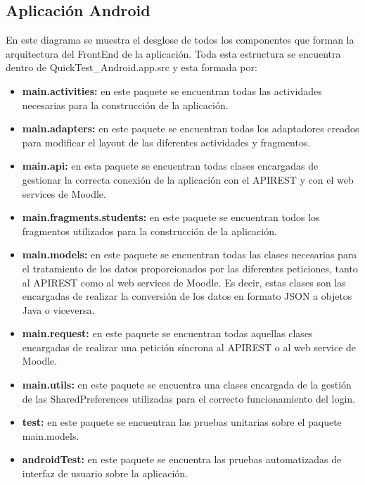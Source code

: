 
\subsection{Aplicación Android}

En este diagrama se muestra el desglose de todos los componentes que forman la arquitectura del FrontEnd de la aplicación. Toda esta estructura se encuentra dentro de QuickTest\_Android.app.src y esta formada por:

\begin{itemize}

	\item \textbf{main.activities:} en este paquete se encuentran todas las actividades necesarias para la construcción de la aplicación.
	\item \textbf{main.adapters:} en este paquete se encuentran todas los adaptadores creados para modificar el layout de las diferentes actividades y fragmentos.
	\item \textbf{main.api:} en esta paquete se encuentran todas clases encargadas de gestionar la correcta conexión de la aplicación con el APIREST y con el web services de Moodle.
	\item \textbf{main.fragments.students:} en este paquete se encuentran todos los fragmentos utilizados para la construcción de la aplicación.
	\item \textbf{main.models:} en este paquete se encuentran todas las clases necesarias para el tratamiento de los datos proporcionados por las diferentes peticiones, tanto al APIREST como al web services de Moodle. Es decir, estas clases son las encargadas de realizar la conversión de los datos en formato JSON a objetos Java o viceversa.
	\item \textbf{main.request:} en este paquete se encuentran todas aquellas clases encargadas de realizar una petición síncrona al APIREST o al web service de Moodle.
	\item \textbf{main.utils:} en este paquete se encuentra una clases encargada de la gestión de las SharedPreferences utilizadas para el correcto funcionamiento del login.
	\item \textbf{test:} en este paquete se encuentran las pruebas unitarias sobre el paquete main.models.
	\item \textbf{androidTest:} en este paquete se encuentra las pruebas automatizadas de interfaz de usuario sobre la aplicación.

\end{itemize}

